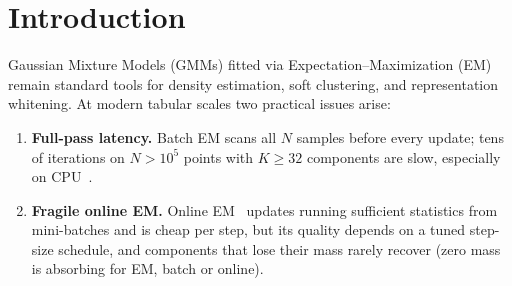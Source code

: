 \documentclass[10pt]{article} %
\begin{document}
\section{Introduction}
\label{sec:intro}

Gaussian Mixture Models (GMMs) fitted via Expectation--Maximization (EM)~\citep{dempster1977em} remain standard tools for density estimation, soft clustering, and representation whitening. At modern tabular scales two practical issues arise:

\begin{enumerate}[leftmargin=*,nosep]
  \item \textbf{Full-pass latency.} Batch EM scans all $N$ samples before every update; tens of iterations on $N > 10^5$ points with $K \ge 32$ components are slow, especially on CPU~\citep{pedregosa2011scikit}.
  \item \textbf{Fragile online EM.} Online EM~\citep{sato2000online,cappe2009online,liang2009online} updates running sufficient statistics from mini-batches and is cheap per step, but its quality depends on a tuned step-size schedule, and components that lose their mass rarely recover (zero mass is absorbing for EM, batch or online).
\end{enumerate}
\end{document}
